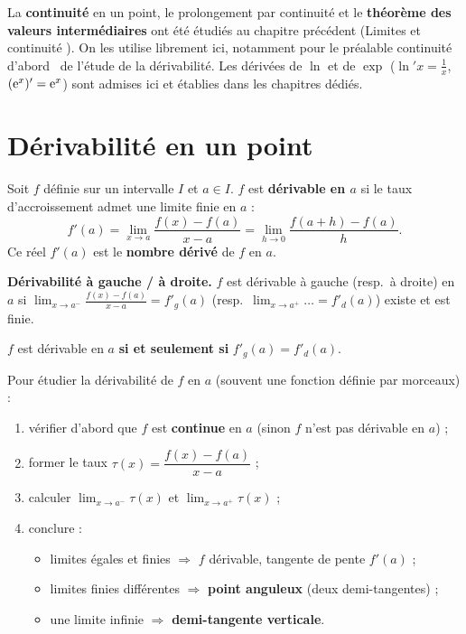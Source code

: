 \begin{remarque}
	La \textbf{continuité} en un point, le prolongement par continuité et le
	\textbf{théorème des valeurs intermédiaires} ont été étudiés au chapitre
	précédent (\og Limites et continuité \fg). On les utilise librement ici,
	notamment pour le préalable \og continuité d'abord \fg\ de l'étude de la
	dérivabilité. Les dérivées de $\ln$ et de $\exp$ ($\ln' x=\tfrac1x$,
	$(\mathrm{e}^x)'=\mathrm{e}^x$) sont admises ici et établies dans les chapitres dédiés.
\end{remarque}


\section{Dérivabilité en un point}

\begin{definition}
	Soit $f$ définie sur un intervalle $I$ et $a\in I$.
	$f$ est \textbf{dérivable en $a$} si le taux d'accroissement admet une
	limite finie en $a$ :
	\[
	f'(a)=\lim_{x\to a}\frac{f(x)-f(a)}{x-a}
	     =\lim_{h\to 0}\frac{f(a+h)-f(a)}{h}.
	\]
	Ce réel $f'(a)$ est le \textbf{nombre dérivé} de $f$ en $a$.
\end{definition}

\begin{definition}
	\textbf{Dérivabilité à gauche / à droite.} $f$ est dérivable à gauche
	(resp.\ à droite) en $a$ si
	$\displaystyle\lim_{x\to a^-}\frac{f(x)-f(a)}{x-a}=f'_g(a)$
	(resp.\ $\displaystyle\lim_{x\to a^+}\dots=f'_d(a)$) existe et est finie.

	$f$ est dérivable en $a$ \textbf{si et seulement si} $f'_g(a)=f'_d(a)$.
\end{definition}

\begin{methode}
	Pour étudier la dérivabilité de $f$ en $a$ (souvent une fonction définie
	par morceaux) :
	\begin{enumerate}
		\item vérifier d'abord que $f$ est \textbf{continue} en $a$
		(sinon $f$ n'est pas dérivable en $a$) ;
		\item former le taux $\tau(x)=\dfrac{f(x)-f(a)}{x-a}$ ;
		\item calculer $\displaystyle\lim_{x\to a^-}\tau(x)$ et
		$\displaystyle\lim_{x\to a^+}\tau(x)$ ;
		\item conclure :
		\begin{itemize}[label=\textbullet]
			\item limites égales et finies $\Rightarrow$ $f$ dérivable, tangente
			de pente $f'(a)$ ;
			\item limites finies différentes $\Rightarrow$ \textbf{point anguleux}
			(deux demi-tangentes) ;
			\item une limite infinie $\Rightarrow$ \textbf{demi-tangente verticale}.
		\end{itemize}
	\end{enumerate}
\end{methode}

